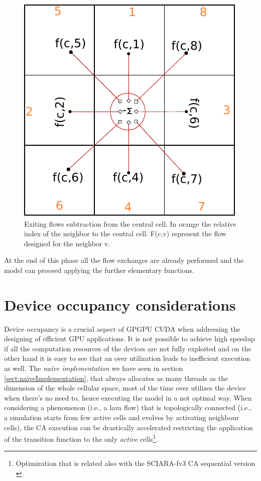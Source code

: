 \begin{figure}
\begin{center}
\includegraphics[scale=1.2]{./images/exitingFlows}  \caption{Exiting flows
subtraction from the central cell. In orange the relative index of the
neighbor to the central cell. F(c,v) represent the flow designed for the
neighbor v.}
\label{fig:exitingFlows}
\end{center}
\end{figure}

At the end of this phase all the flow exchanges are already performed and the
model can proceed applying the further elementary functions.

\section{Device occupancy considerations}\label{sect:idleThreadsDevOccupancy}
Device occupancy is a crucial aspect of GPGPU CUDA when addressing the designing
of efficient GPU applications.
It is not possible to achieve high speedup if all the computation resources of
the devices are not fully exploited and on the other hand it is easy to see that
an over utilization leads to inefficient execution as well. The
\textit{na\"{i}ve implementation} we have seen in section
\ref{sect:naiveImplementation}, that always allocates as many threads as the
dimension of the whole cellular space, most of the time over utilizes the device
when there's no need to, hence executing the model in a not optimal way.
When considering a phenomenon (i.e., a lava flow) that is topologically
connected (i.e., a simulation starts from few active cells and evolves by
activating neighbour cells), the CA execution can be drastically accelerated
restricting the application of the transition function to the only
\textit{active} cells\footnote{Optimization that is related also with the
SCIARA-fv3 CA sequential version \cite{Walter2004}}.

